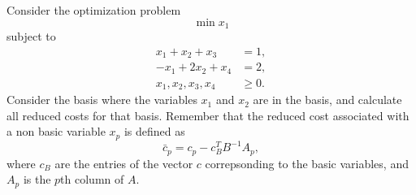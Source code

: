 Consider the optimization problem
\[
\min x_1
\]
subject to
\begin{align*}
x_1+x_2+x_3 & =1,\\
-x_1+2x_2+x_4 &=2,\\
x_1,x_2,x_3,x_4 & \geq 0.
\end{align*}
Consider the basis where the  variables
$x_1$ and $x_2$ are in the basis, and calculate all reduced costs for
that basis. Remember that the reduced cost associated with a non basic variable $x_p$ is defined as
\[
\bar{c}_p = c_p - c_B^T B^{-1} A_p,
\]
where $c_B$ are the entries of the vector $c$ correpsonding to the basic variables, and $A_p$ is the $p$th column of $A$.

